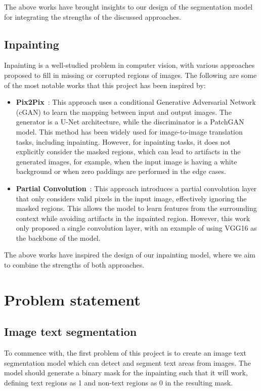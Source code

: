 \documentclass[10pt,twocolumn,letterpaper]{article}
\begin{document}
The above works have brought insights to our design of the segmentation model for integrating the strengths of the discussed approaches.

\subsection{Inpainting}

Inpainting is a well-studied problem in computer vision, with various approaches proposed to fill in missing or corrupted regions of images.
The following are some of the most notable works that this project has been inspired by:

\begin{itemize}
    \item \textbf{Pix2Pix}~\cite{Isola2018}: This approach uses a conditional Generative Adversarial Network (cGAN) to learn the mapping between input and output images. 
    The generator is a U-Net architecture, while the discriminator is a PatchGAN model. This method has been widely used for image-to-image translation tasks, including inpainting.
    However, for inpainting tasks, it does not explicitly consider the masked regions, which can lead to artifacts in the generated images, for example, when the input image is having a 
    white background or when zero paddings are performed in the edge cases.
    \item \textbf{Partial Convolution}~\cite{Liu2018}: This approach introduces a partial convolution layer that only considers valid pixels in the input image, 
    effectively ignoring the masked regions. This allows the model to learn features from the surrounding context while avoiding artifacts in the inpainted region.
    However, this work only proposed a single convolution layer, with an example of using VGG16 as the backbone of the model.
\end{itemize}

The above works have inspired the design of our inpainting model, where we aim to combine the strengths of both approaches.

\section{Problem statement}

\subsection{Image text segmentation}
To commence with, the first problem of this project is to create an image text segmentation model which can detect and segment text areas from images.
The model should generate a binary mask for the inpainting such that it will work, defining text regions as 1 and non-text regions as 0 in the resulting mask.
\end{document}
